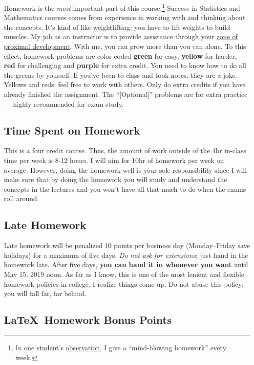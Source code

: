 \documentclass[12pt]{article}
\newcommand{\ingreen}[1]{\color{green}\textbf{#1} \color{black}}
\newcommand{\inyellow}[1]{\color{yellow}\textbf{#1} \color{black}}
\newcommand{\inred}[1]{\color{red}\textbf{#1} \color{black}}
\newcommand{\inpurple}[1]{\color{purple}\textbf{#1} \color{black}}
\newcommand{\qu}[1]{``#1''}
\begin{document}
Homework is the \textit{most} important part of this course.\footnote{In one student's \href{http://www.ratemyprofessors.com/ShowRatings.jsp?tid=1951051}{observation}, I give a \qu{mind-blowing homework} every week.} Success in Statistics and Mathematics courses comes from experience in working with and thinking about the concepts. It's kind of like weightlifting; you have to lift weights to build muscles. My job as an instructor is to provide assistance through your \href{http://en.wikipedia.org/wiki/Zone_of_proximal_development}{zone of proximal development}. With me, you can grow more than you can alone. To this effect, homework problems are color coded \ingreen{green} for easy, \inyellow{yellow} for harder, \inred{red} for challenging and \inpurple{purple} for extra credit. You need to know how to do all the greens by yourself. If you've been to class and took notes, they are a joke. Yellows and reds: feel free to work with others. Only do extra credits if you have already finished the assignment. The \qu{[Optional]} problems are for extra practice --- highly recommended for exam study.

\subsection*{Time Spent on Homework }

This is a four credit course. Thus, the amount of work outside of the 4hr in-class time per week is 8-12 hours. I will aim for 10hr of homework per week on average. However, doing the homework well is your sole responsibility since I will make sure that by doing the homework you will study and understand the concepts in the lectures and you won't have all that much to do when the exams roll around.

\subsection*{Late Homework}

Late homework will be penalized 10 points per business day (Monday--Friday save holidays) for a maximum of five days. \textit{Do not ask for extensions}; just hand in the homework late. After five days, \textbf{you can hand it in whenever you want} until May 15, 2019 noon. As far as I know, this is one of the most lenient and flexible homework policies in college. I realize things come up. Do not abuse this policy; you will fall far, far behind.

\subsection*{\LaTeX~Homework Bonus Points}
\end{document}
